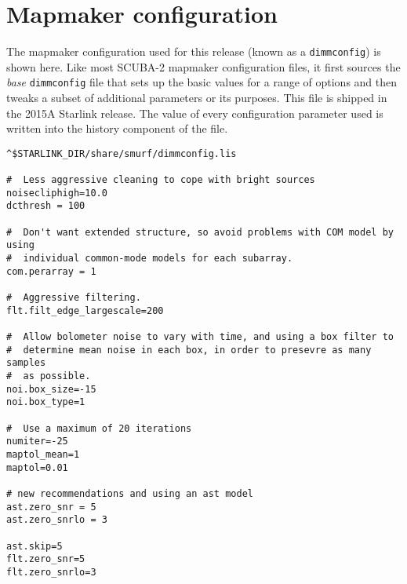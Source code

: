 \documentclass[usenatbib]{mn2e}
\begin{document}



\appendix
\onecolumn

\section{Mapmaker configuration}
The mapmaker configuration used for this release (known as a
\texttt{dimmconfig}) is shown here. Like most SCUBA-2 mapmaker
configuration files, it first sources the \emph{base}
\texttt{dimmconfig} file that sets up the basic values for a range of
options and then tweaks a subset of additional parameters or its
purposes. This file is shipped in the 2015A Starlink release. The
value of every configuration parameter used is written into the
history component of the file.

\begin{verbatim}
^$STARLINK_DIR/share/smurf/dimmconfig.lis

#  Less aggressive cleaning to cope with bright sources
noisecliphigh=10.0
dcthresh = 100

#  Don't want extended structure, so avoid problems with COM model by using
#  individual common-mode models for each subarray.
com.perarray = 1

#  Aggressive filtering.
flt.filt_edge_largescale=200

#  Allow bolometer noise to vary with time, and using a box filter to
#  determine mean noise in each box, in order to presevre as many samples
#  as possible.
noi.box_size=-15
noi.box_type=1

#  Use a maximum of 20 iterations
numiter=-25
maptol_mean=1
maptol=0.01

# new recommendations and using an ast model
ast.zero_snr = 5
ast.zero_snrlo = 3

ast.skip=5
flt.zero_snr=5
flt.zero_snrlo=3
\end{verbatim}


\label{lastpage}
\bsp
\end{document}
